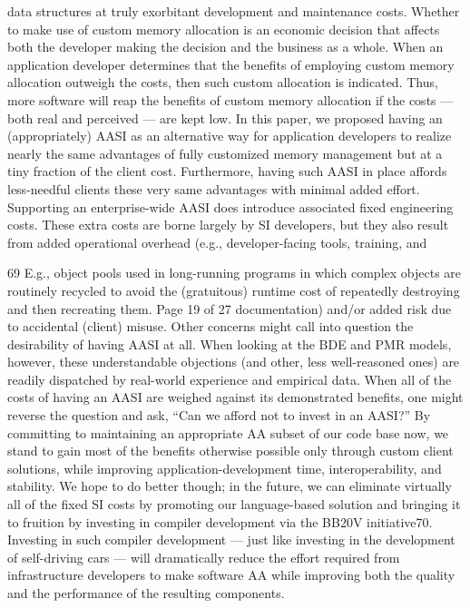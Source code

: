 data structures at truly exorbitant development and maintenance costs.
Whether to make use of custom memory allocation is an economic decision that
affects both the developer making the decision and the business as a whole. When
an application developer determines that the benefits of employing custom memory
allocation outweigh the costs, then such custom allocation is indicated. Thus, more
software will reap the benefits of custom memory allocation if the costs — both real
and perceived — are kept low.
In this paper, we proposed having an (appropriately) AASI as an alternative way for
application developers to realize nearly the same advantages of fully customized
memory management but at a tiny fraction of the client cost. Furthermore, having
such AASI in place affords less-needful clients these very same advantages with
minimal added effort.
Supporting an enterprise-wide AASI does introduce associated fixed engineering
costs. These extra costs are borne largely by SI developers, but they also result from
added operational overhead (e.g., developer-facing tools, training, and

69 E.g., object pools used in long-running programs in which complex objects are routinely recycled to
avoid the (gratuitous) runtime cost of repeatedly destroying and then recreating them.
Page 19 of 27
documentation) and/or added risk due to accidental (client) misuse. Other concerns
might call into question the desirability of having AASI at all. When looking at the
BDE and PMR models, however, these understandable objections (and other, less
well-reasoned ones) are readily dispatched by real-world experience and empirical
data.
When all of the costs of having an AASI are weighed against its demonstrated
benefits, one might reverse the question and ask, “Can we afford not to invest in an
AASI?” By committing to maintaining an appropriate AA subset of our code base
now, we stand to gain most of the benefits otherwise possible only through custom
client solutions, while improving application-development time, interoperability, and
stability. We hope to do better though; in the future, we can eliminate virtually all of
the fixed SI costs by promoting our language-based solution and bringing it to
fruition by investing in compiler development via the BB20V initiative70. Investing in
such compiler development — just like investing in the development of self-driving
cars — will dramatically reduce the effort required from infrastructure developers to
make software AA while improving both the quality and the performance of the
resulting components.

